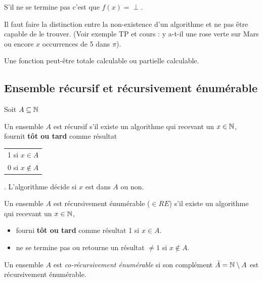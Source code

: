 S'il ne se termine pas c'est que $f(x)=\perp$.

\begin{myrem}
	Il faut faire la distinction entre la non-existence d'un algorithme
	et ne pas être capable de le trouver.
    (Voir exemple TP et cours : y a-t-il une rose verte sur Mars
    ou encore $x$ occurrences de 5 dans $\pi$).
\end{myrem}

\begin{myrem}
	Une fonction peut-être totale calculable ou partielle calculable.
\end{myrem}


\subsection{Ensemble récursif et récursivement énumérable}
\label{ssub:ensemble_r_cursif_et_r_cursivement_num_rable}
Soit $A\subseteq \mathbb{N}$

\begin{mydef}
	Un ensemble $A$ est récursif s'il existe un algorithme qui recevant un $x\in \mathbb{N}$,
	fournit \textbf{tôt ou tard} comme résultat
	\begin{tabular}{l}
		1 si $x\in A$\\
		0 si $x\notin A$\\
	\end{tabular}
	. L'algorithme décide si $x$ est dans $A$ ou non.
\end{mydef}

\begin{mydef}
	Un ensemble $A$ est récursivement énumérable ($\in RE$) s’il existe un algorithme qui recevant
	un $x\in \mathbb{N}$,
    \begin{itemize}
      \item fourni \textbf{tôt ou tard} comme résultat 1 si $x\in A$.
      \item ne se termine pas ou retourne un résultat $\neq1$ si $x \notin A$.
	\end{itemize}
\end{mydef}

\begin{mydef}
  Un ensemble $A$ est \emph{co-récursivement énumérable}
  si son complément $\bar{A} = \mathbb{N} \setminus A$ est récursivement énumérable.
\end{mydef}

